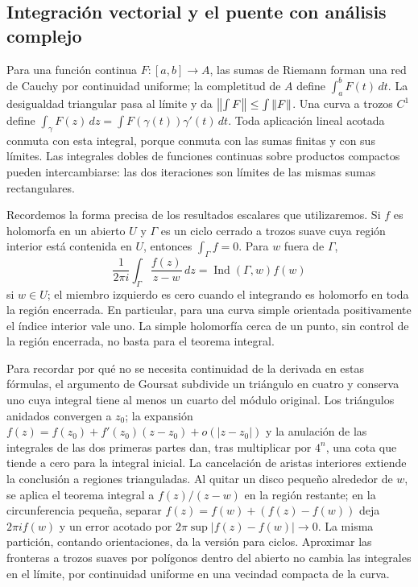 \subsection{Integración vectorial y el puente con análisis complejo}
Para una función continua $F:[a,b]\to A$, las sumas de Riemann forman una red de Cauchy por continuidad uniforme; la completitud de $A$ define $\int_a^bF(t)\,dt$. La desigualdad triangular pasa al límite y da $\left\lVert\int F\right\rVert\le\int\left\lVert F\right\rVert$. Una curva a trozos $C^1$ define $\int_\gamma F(z)\,dz=\int F(\gamma(t))\gamma'(t)\,dt$. Toda aplicación lineal acotada conmuta con esta integral, porque conmuta con las sumas finitas y con sus límites. Las integrales dobles de funciones continuas sobre productos compactos pueden intercambiarse: las dos iteraciones son límites de las mismas sumas rectangulares.

Recordemos la forma precisa de los resultados escalares que utilizaremos. Si $f$ es holomorfa en un abierto $U$ y $\Gamma$ es un ciclo cerrado a trozos suave cuya región interior está contenida en $U$, entonces $\int_\Gamma f=0$. Para $w$ fuera de $\Gamma$,
\[
 \frac1{2\pi i}\int_\Gamma\frac{f(z)}{z-w}\,dz
 =\operatorname{Ind}(\Gamma,w)f(w)
\]
si $w\in U$; el miembro izquierdo es cero cuando el integrando es holomorfo en toda la región encerrada. En particular, para una curva simple orientada positivamente el índice interior vale uno. La simple holomorfía cerca de un punto, sin control de la región encerrada, no basta para el teorema integral.

Para recordar por qué no se necesita continuidad de la derivada en estas fórmulas, el argumento de Goursat subdivide un triángulo en cuatro y conserva uno cuya integral tiene al menos un cuarto del módulo original. Los triángulos anidados convergen a $z_0$; la expansión $f(z)=f(z_0)+f'(z_0)(z-z_0)+o(|z-z_0|)$ y la anulación de las integrales de las dos primeras partes dan, tras multiplicar por $4^n$, una cota que tiende a cero para la integral inicial. La cancelación de aristas interiores extiende la conclusión a regiones trianguladas. Al quitar un disco pequeño alrededor de $w$, se aplica el teorema integral a $f(z)/(z-w)$ en la región restante; en la circunferencia pequeña, separar $f(z)=f(w)+(f(z)-f(w))$ deja $2\pi i f(w)$ y un error acotado por $2\pi\sup|f(z)-f(w)|\to0$. La misma partición, contando orientaciones, da la versión para ciclos. Aproximar las fronteras a trozos suaves por polígonos dentro del abierto no cambia las integrales en el límite, por continuidad uniforme en una vecindad compacta de la curva.

